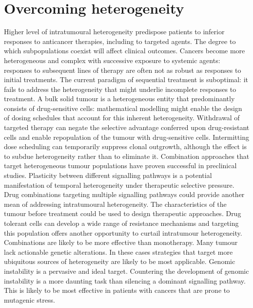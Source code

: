 \section{Overcoming heterogeneity}
Higher level of intratumoural heterogeneity predispose patients to inferior responses to anticancer therapies, including to targeted agents.
The degree to which subpopulations coexist will affect clinical outcomes.
Cancers become more heterogeneous and complex with successive exposure to systemic agents: responses to subsequent lines of therapy are often not as robust as responses to initial treatments.
The current paradigm of sequential treatment is suboptimal: it fails to address the heterogeneity that might underlie incomplete responses to treatment.
A bulk solid tumour is a heterogeneous entity that predominantly consists of drug-sensitive cells: mathematical modelling might enable the design of dosing schedules that account for this inherent heterogeneity.
Withdrawal of targeted therapy can negate the selective advantage conferred upon drug-resistant cells and enable repopulation of the tumour with drug-sensitive cells.
Intermitting dose scheduling can temporarily suppress clonal outgrowth, although the effect is to subdue heterogeneity rather than to eliminate it.
Combination approaches that target heterogeneous tumour populations have proven successful in preclinical studies.
Plasticity between different signalling pathways is a potential manifestation of temporal heterogeneity under therapeutic selective pressure.
Drug combinations targeting multiple signalling pathways could provide another mean of addressing intratumoural heterogeneity.
The characteristics of the tumour before treatment could be used to design therapeutic approaches.
Drug tolerant cells can develop a wide range of resistance mechanisms and targeting this population offers another opportunity to curtail intratumour heterogeneity.
Combinations are likely to be more effective than monotherapy.
Many tumour lack actionable genetic alterations.
In these cases strategies that target more ubiquitous sources of heterogeneity are likely to be most applicable.
Genomic instability is a pervasive and ideal target.
Countering the development of genomic instability is a more daunting task than silencing a dominant signalling pathway.
This is likely to be most effective in patients with cancers that are prone to mutagenic stress.
